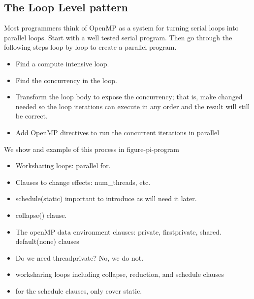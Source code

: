 \subsection{The Loop Level pattern}
\label{sec:patternsLoops}

Most programmers think of OpenMP as a system for turning serial loops into parallel loops.  Start with a well tested serial program.  
Then go through the following steps loop by loop to create a parallel program.
\begin{itemize}
\item Find a compute intensive loop.
\item Find the concurrency in the loop.  
\item Transform the loop body to expose the concurrency; that is, make changed needed 
so the loop iterations can execute in any order and the result will still be correct.
\item Add OpenMP directives to run the concurrent iterations in parallel
\end{itemize}
We show and example of this process in figure-pi-program



\begin{itemize}
  \item Worksharing loops: parallel for.
  \item Clauses to change effects: num\_threads, etc.
  \item schedule(static) important to introduce as will need it later.
  \item collapse() clause.
\end{itemize}

\begin{itemize}
\item The openMP data environment clauses: private, firstprivate, shared.  default(none) clauses
\item Do we need threadprivate?  No, we do not.
\item worksharing loops including collapse, reduction, and schedule clauses
\item for the schedule clauses, only cover static. 
\end{itemize}


